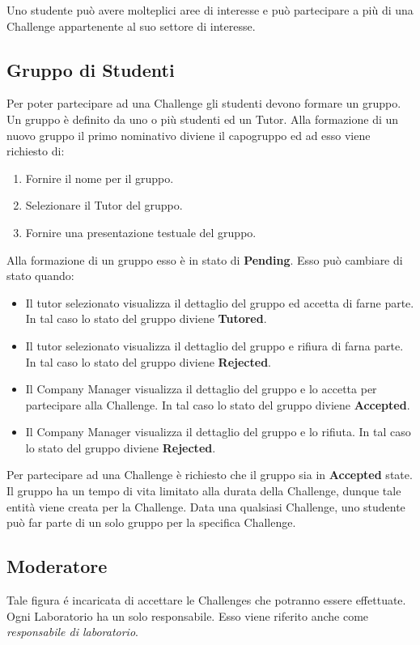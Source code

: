 Uno studente può avere molteplici aree di interesse e può partecipare a più di una Challenge appartenente al suo settore di interesse.

\subsection{Gruppo di Studenti}
\label{subsec:gruppo_studenti}
Per poter partecipare ad una Challenge gli studenti devono formare un gruppo. Un gruppo è definito da uno o più studenti ed un Tutor. 
Alla formazione di un nuovo gruppo il primo nominativo diviene il capogruppo ed ad esso viene richiesto di:
 \begin{enumerate}
        \item Fornire il nome per il gruppo.
        \item Selezionare il Tutor del gruppo. 
        \item Fornire una presentazione testuale del gruppo. 
\end{enumerate}

Alla formazione di un gruppo esso è in stato di \textbf{Pending}. Esso può cambiare di stato quando:
\begin{itemize}
    \item Il tutor selezionato visualizza il dettaglio del gruppo ed accetta di farne parte. In tal caso lo stato del gruppo diviene \textbf{Tutored}. 
    \item Il tutor selezionato visualizza il dettaglio del gruppo e rifiura di farna parte. In tal caso lo stato del gruppo diviene \textbf{Rejected}. 
    \item Il Company Manager visualizza il dettaglio del gruppo e lo accetta per partecipare alla Challenge. In tal caso lo stato del gruppo diviene \textbf{Accepted}. 
    \item Il Company Manager visualizza il dettaglio del gruppo e lo rifiuta. In tal caso lo stato del gruppo diviene \textbf{Rejected}. 
\end{itemize}

Per partecipare ad una Challenge è richiesto che il gruppo sia in \textbf{Accepted} state. Il gruppo ha un tempo di vita limitato alla durata della Challenge, dunque tale entità viene creata per la Challenge. Data una qualsiasi Challenge, uno studente può far parte di un solo gruppo per la specifica Challenge.



\subsection{Moderatore}
\label{sec:moderatore}
Tale figura é incaricata di accettare le Challenges che potranno essere effettuate. Ogni Laboratorio ha un solo responsabile. Esso viene riferito anche come \textit{responsabile di laboratorio}.

